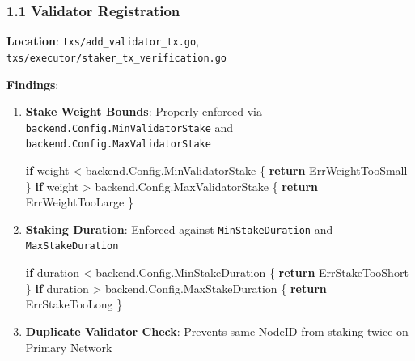 \documentclass[
]{article}
\newenvironment{Shaded}{}{}
\newcommand{\ControlFlowTok}[1]{\textcolor[rgb]{0.00,0.44,0.13}{\textbf{#1}}}
\newcommand{\NormalTok}[1]{#1}
\newcommand{\OperatorTok}[1]{\textcolor[rgb]{0.40,0.40,0.40}{#1}}
\begin{document}
\subsubsection{1.1 Validator
Registration}\label{11-validator-registration}

\textbf{Location}: \texttt{txs/add\_validator\_tx.go},
\texttt{txs/executor/staker\_tx\_verification.go}

\textbf{Findings}:

\begin{enumerate}
\def\labelenumi{\arabic{enumi}.}
\item
  \textbf{Stake Weight Bounds}: Properly enforced via
  \texttt{backend.Config.MinValidatorStake} and
  \texttt{backend.Config.MaxValidatorStake}

\begin{Shaded}
\begin{Highlighting}[]
\ControlFlowTok{if}\NormalTok{ weight }\OperatorTok{\textless{}}\NormalTok{ backend}\OperatorTok{.}\NormalTok{Config}\OperatorTok{.}\NormalTok{MinValidatorStake }\OperatorTok{\{}
    \ControlFlowTok{return}\NormalTok{ ErrWeightTooSmall}
\OperatorTok{\}}
\ControlFlowTok{if}\NormalTok{ weight }\OperatorTok{\textgreater{}}\NormalTok{ backend}\OperatorTok{.}\NormalTok{Config}\OperatorTok{.}\NormalTok{MaxValidatorStake }\OperatorTok{\{}
    \ControlFlowTok{return}\NormalTok{ ErrWeightTooLarge}
\OperatorTok{\}}
\end{Highlighting}
\end{Shaded}
\item
  \textbf{Staking Duration}: Enforced against \texttt{MinStakeDuration}
  and \texttt{MaxStakeDuration}

\begin{Shaded}
\begin{Highlighting}[]
\ControlFlowTok{if}\NormalTok{ duration }\OperatorTok{\textless{}}\NormalTok{ backend}\OperatorTok{.}\NormalTok{Config}\OperatorTok{.}\NormalTok{MinStakeDuration }\OperatorTok{\{}
    \ControlFlowTok{return}\NormalTok{ ErrStakeTooShort}
\OperatorTok{\}}
\ControlFlowTok{if}\NormalTok{ duration }\OperatorTok{\textgreater{}}\NormalTok{ backend}\OperatorTok{.}\NormalTok{Config}\OperatorTok{.}\NormalTok{MaxStakeDuration }\OperatorTok{\{}
    \ControlFlowTok{return}\NormalTok{ ErrStakeTooLong}
\OperatorTok{\}}
\end{Highlighting}
\end{Shaded}
\item
  \textbf{Duplicate Validator Check}: Prevents same NodeID from staking
  twice on Primary Network


\end{enumerate}
\end{document}
